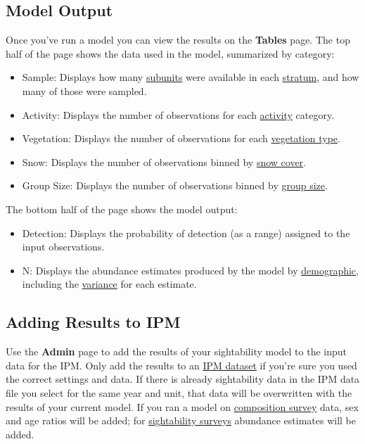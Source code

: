 \documentclass[
]{book}
\providecommand{\tightlist}{%
  \setlength{\itemsep}{0pt}\setlength{\parskip}{0pt}}
\begin{document}
\hypertarget{sight-output}{%
\subsection{Model Output}\label{sight-output}}

Once you've run a model you can view the results on the \textbf{Tables} page. The top half of the page shows the data used in the model, summarized by category:

\begin{itemize}
\tightlist
\item
  Sample: Displays how many \protect\hyperlink{gl-subunit}{subunits} were available in each \protect\hyperlink{gl-stratum}{stratum}, and how many of those were sampled.
\item
  Activity: Displays the number of observations for each \protect\hyperlink{gl-movement}{activity} category.
\item
  Vegetation: Displays the number of observations for each \protect\hyperlink{gl-veg}{vegetation type}.
\item
  Snow: Displays the number of observations binned by \protect\hyperlink{gl-snow}{snow cover}.
\item
  Group Size: Displays the number of observations binned by \protect\hyperlink{gl-group-size}{group size}.
\end{itemize}

The bottom half of the page shows the model output:

\begin{itemize}
\tightlist
\item
  Detection: Displays the probability of detection (as a range) assigned to the input observations.
\item
  N: Displays the abundance estimates produced by the model by \protect\hyperlink{gl-demographic}{demographic}, including the \protect\hyperlink{gl-variance}{variance} for each estimate.
\end{itemize}

\hypertarget{sight-admin}{%
\subsection{Adding Results to IPM}\label{sight-admin}}

Use the \textbf{Admin} page to add the results of your sightability model to the input data for the IPM. Only add the results to an \protect\hyperlink{gl-ipm-db}{IPM dataset} if you're sure you used the correct settings and data. If there is already sightability data in the IPM data file you select for the same year and unit, that data will be overwritten with the results of your current model. If you ran a model on \protect\hyperlink{gl-comp-survey}{composition survey} data, sex and age ratios will be added; for \protect\hyperlink{gl-sight-survey}{sightability surveys} abundance estimates will be added.
\end{document}
